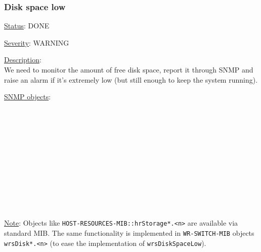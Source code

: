 \subsubsection{\bf Disk space low}
		\label{fail:other:no_disk}
		\begin{pck_descr}
			\item [] \underline{Status}: DONE
			\item [] \underline{Severity}: WARNING
			\item [] \underline{Description}:\\
				We need to monitor the amount of free disk space, report it through SNMP
				and raise an alarm if it's extremely low (but still enough to keep the
				system running).
			\item [] \underline{SNMP objects}:\\
				{\footnotesize
				\\
				\\
				\\
				\\
				\\
				\\
				\\
				\\
				\\
				\\
				\\
				 }
			\item [] \underline{Note}:
				Objects like \texttt{HOST-RESOURCES-MIB::hrStorage*.<n>} are available
				via standard MIB. The same functionality is implemented in
				\texttt{WR-SWITCH-MIB} objects \texttt{wrsDisk*.<n>} (to ease the
				implementation of \texttt{wrsDiskSpaceLow}).
		\end{pck_descr}

